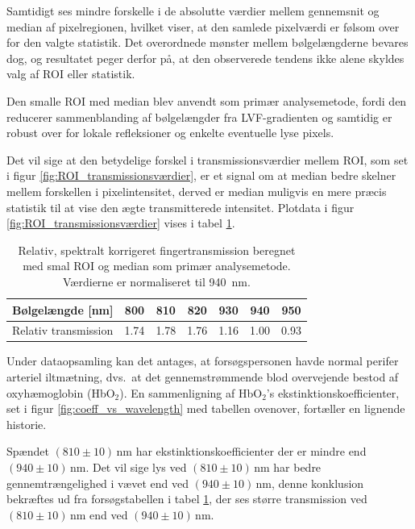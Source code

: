 Samtidigt ses mindre forskelle i de absolutte værdier mellem gennemsnit og median af pixelregionen, hvilket viser, at den samlede pixelværdi er følsom over for den valgte statistik. Det overordnede mønster mellem bølgelængderne bevares dog, og resultatet peger derfor på, at den observerede tendens ikke alene skyldes valg af ROI eller statistik.

Den smalle ROI med median blev anvendt som primær analysemetode, fordi den reducerer sammenblanding af bølgelængder fra LVF-gradienten og samtidig er robust over for lokale refleksioner og enkelte eventuelle lyse pixels.

Det vil sige at den betydelige forskel i transmissionsværdier mellem ROI, som set i figur \ref{fig:ROI_transmissionsværdier}, er et signal om at median bedre skelner mellem forskellen i pixelintensitet, derved er median muligvis en mere præcis statistik til at vise den ægte transmitterede intensitet. Plotdata i figur \ref{fig:ROI_transmissionsværdier} vises i tabel \ref{tab:hyperspectral_relative_transmission}.
\begin{table}[h]
\centering
\caption{Relativ, spektralt korrigeret fingertransmission beregnet med smal ROI og median som primær analysemetode. Værdierne er normaliseret til \SI{940}{nm}.}
\label{tab:hyperspectral_relative_transmission}
\begin{tabular}{lcccccc}
\toprule
Bølgelængde [nm] & 800 & 810 & 820 & 930 & 940 & 950 \\
\midrule
Relativ transmission & 1.74 & 1.78 & 1.76 & 1.16 & 1.00 & 0.93 \\
\bottomrule
\end{tabular}
\end{table}

Under dataopsamling kan det antages, at forsøgspersonen havde normal perifer arteriel iltmætning, dvs.\ at det gennemstrømmende blod overvejende bestod af oxyhæmoglobin (HbO$_2$). En sammenligning af HbO$_2$'s ekstinktionskoefficienter, set i figur \ref{fig:coeff_vs_wavelength} med tabellen ovenover, fortæller en lignende historie.

Spændet $(810 \pm 10)\,\mathrm{nm}$ har ekstinktionskoefficienter der er mindre end $(940 \pm 10)\,\mathrm{nm}$. Det vil sige lys ved $(810 \pm 10)\,\mathrm{nm}$ har bedre gennemtrængelighed i vævet end ved $(940 \pm 10)\,\mathrm{nm}$, denne konklusion bekræftes ud fra forsøgstabellen i tabel \ref{tab:hyperspectral_relative_transmission}, der ses større transmission ved $(810 \pm 10)\,\mathrm{nm}$ end ved $(940 \pm 10)\,\mathrm{nm}$.

